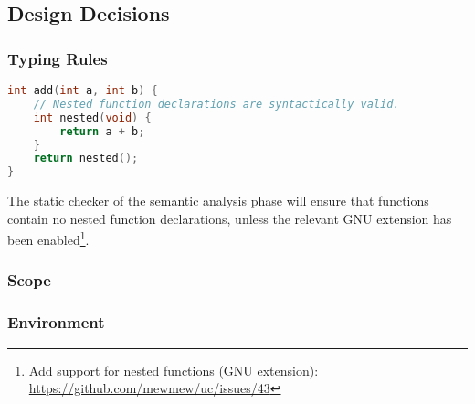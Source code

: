 \subsection{Design Decisions}

\subsubsection{Typing Rules}

\begin{lstlisting}[language=C,style=c,caption={\label{fig:nested_func_decl}Nested function declarations.}]
int add(int a, int b) {
	// Nested function declarations are syntactically valid.
	int nested(void) {
		return a + b;
	}
	return nested();
}
\end{lstlisting}

The static checker of the semantic analysis phase will ensure that functions contain no nested function declarations, unless the relevant GNU extension has been enabled\footnote{Add support for nested functions (GNU extension): \url{https://github.com/mewmew/uc/issues/43}}.

\subsubsection{Scope}


\subsubsection{Environment}



